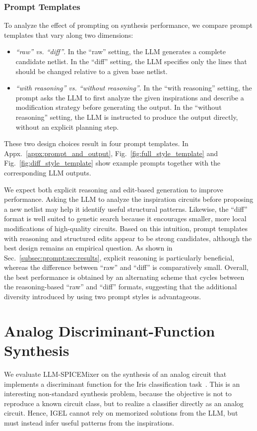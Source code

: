 \documentclass[sigconf,pbalance]{acmart_modified}
\newcommand{\squeezeSection}{}
\newcommand{\llmspm}{LLM-SPICE\-Mixer}
\begin{document}
\subsubsection*{Prompt Templates}
To analyze the effect of prompting on synthesis performance, we compare prompt templates that vary along two dimensions:
\begin{itemize}[noitemsep, topsep=0pt, leftmargin=*]
    \item \emph{``raw'' vs. ``diff''}. In the ``raw'' setting, the LLM generates a complete candidate netlist. In the ``diff'' setting, the LLM specifies only the lines that should be changed relative to a given base netlist.
    \item \emph{``with reasoning'' vs. ``without reasoning''}. In the ``with reasoning'' setting, the prompt asks the LLM to first analyze the given inspirations and describe a modification strategy before generating the output. In the ``without reasoning'' setting, the LLM is instructed to produce the output directly, without an explicit planning step.
\end{itemize}
These two design choices result in four prompt templates. In Appx.~\ref{appx:prompt_and_output}, Fig.~\ref{fig:full_style_template} and Fig.~\ref{fig:diff_style_template} show example prompts together with the corresponding LLM outputs.

We expect both explicit reasoning and edit-based generation to improve performance. Asking the LLM to analyze the inspiration circuits before proposing a new netlist may help it identify useful structural patterns. Likewise, the ``diff'' format is well suited to genetic search because it encourages smaller, more local modifications of high-quality circuits. Based on this intuition, prompt templates with reasoning and structured edits appear to be strong candidates, although the best design remains an empirical question. As shown in Sec.~\ref{subsec:prompt:sec:results}, explicit reasoning is particularly beneficial, whereas the difference between ``raw'' and ``diff'' is comparatively small. Overall, the best performance is obtained by an alternating scheme that cycles between the reasoning-based ``raw'' and ``diff'' formats, suggesting that the additional diversity introduced by using two prompt styles is advantageous.



\squeezeSection\section{Analog Discriminant-Function Synthesis}
\label{sec:synthesis_task}
We evaluate \llmspm{} on the synthesis of an analog circuit that implements a discriminant function for the Iris classification task~\cite{fisher1936use}. This is an interesting non-standard synthesis problem, because the objective is not to reproduce a known circuit class, but to realize a classifier directly as an analog circuit. Hence, IGEL cannot rely on memorized solutions from the LLM, but must instead infer useful patterns from the inspirations.
\end{document}

